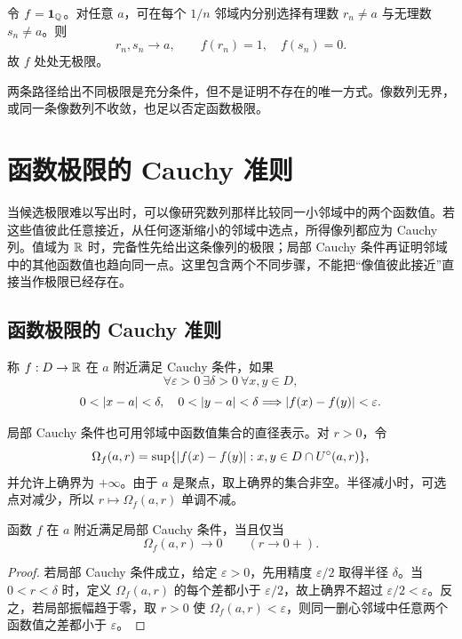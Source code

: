 \begin{example}[有理与无理路径]
令 \(f=\mathbf1_{\mathbb{Q}}\)。对任意 \(a\)，可在每个 \(1/n\) 邻域内分别选择有理数 \(r_n\ne a\) 与无理数 \(s_n\ne a\)。则
\[
 r_n,s_n\to a,\qquad f(r_n)=1,\quad f(s_n)=0.
\]
故 \(f\) 处处无极限。
\end{example}

两条路径给出不同极限是充分条件，但不是证明不存在的唯一方式。像数列无界，或同一条像数列不收敛，也足以否定函数极限。

\section{函数极限的 Cauchy 准则}

当候选极限难以写出时，可以像研究数列那样比较同一小邻域中的两个函数值。若这些值彼此任意接近，从任何逐渐缩小的邻域中选点，所得像列都应为 Cauchy 列。值域为 \(\mathbb{R}\) 时，完备性先给出这条像列的极限；局部 Cauchy 条件再证明邻域中的其他函数值也趋向同一点。这里包含两个不同步骤，不能把“像值彼此接近”直接当作极限已经存在。

\subsection{函数极限的 Cauchy 准则}

\begin{definition}[局部 Cauchy 条件]
称 \(f:D\to\mathbb{R}\) 在 \(a\) 附近满足 Cauchy 条件，如果
\[
 \forall\varepsilon>0\ \exists\delta>0\ \forall x,y\in D,
\]
\[
 0<\left|x-a\right|<\delta,\quad0<\left|y-a\right|<\delta
 \Longrightarrow\left|f(x)-f(y)\right|<\varepsilon.
\]
\end{definition}

局部 Cauchy 条件也可用邻域中函数值集合的直径表示。对 \(r>0\)，令
\[
 \Omega_f(a,r)=\sup\{\left|f(x)-f(y)\right|:
 x,y\in D\cap U^\circ(a,r)\},
\]
并允许上确界为 \(+\infty\)。由于 \(a\) 是聚点，取上确界的集合非空。半径减小时，可选点对减少，所以 \(r\mapsto\Omega_f(a,r)\) 单调不减。

\begin{proposition}[局部振幅判据]
函数 \(f\) 在 \(a\) 附近满足局部 Cauchy 条件，当且仅当
\[
 \Omega_f(a,r)\longrightarrow0\qquad(r\to0+).
\]
\end{proposition}

\begin{proof}
若局部 Cauchy 条件成立，给定 \(\varepsilon>0\)，先用精度 \(\varepsilon/2\) 取得半径 \(\delta\)。当 \(0<r<\delta\) 时，定义 \(\Omega_f(a,r)\) 的每个差都小于 \(\varepsilon/2\)，故上确界不超过 \(\varepsilon/2<\varepsilon\)。反之，若局部振幅趋于零，取 \(r>0\) 使 \(\Omega_f(a,r)<\varepsilon\)，则同一删心邻域中任意两个函数值之差都小于 \(\varepsilon\)。
\end{proof}

